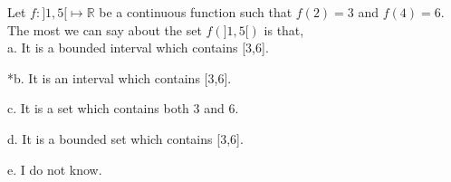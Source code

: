 
Let \(f:]1,5[ \mapsto \mathbb{R}\) be a continuous function such that \(f(2) = 3\) and \(f(4) = 6\). The
most we can say about the set \(f(]1,5[)\) is that,\\

a. It is a bounded interval which contains {[}3,6{]}.

*b. It is an interval which contains {[}3,6{]}.

c. It is a set which contains both 3 and 6.

d. It is a bounded set which contains {[}3,6{]}.

e. I do not know.\\

